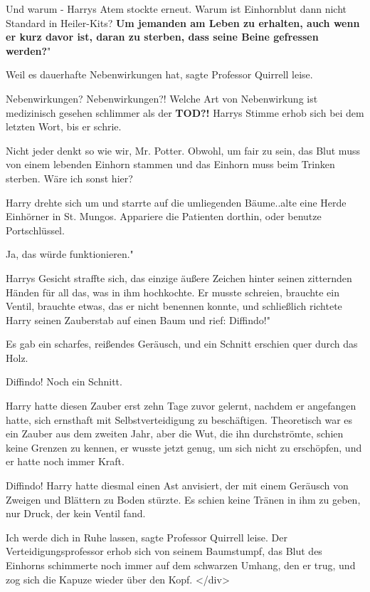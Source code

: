 \glqq{}Und warum -\grqq{} Harrys Atem stockte erneut. \glqq{}Warum ist Einhornblut
dann nicht Standard in Heiler-Kits? \textbf{Um jemanden am Leben zu
erhalten, auch wenn er kurz davor ist, daran zu sterben, dass seine Beine
gefressen werden?}"

\glqq{}Weil es dauerhafte Nebenwirkungen hat\grqq{}, sagte Professor Quirrell
leise.

\glqq{}Nebenwirkungen? Nebenwirkungen?! Welche Art von Nebenwirkung ist
medizinisch gesehen schlimmer als der \textbf{TOD?!}\grqq{} Harrys Stimme
erhob sich bei dem letzten Wort, bis er schrie.

\glqq{}Nicht jeder denkt so wie wir, Mr. Potter. Obwohl, um fair zu sein, das
Blut muss von einem lebenden Einhorn stammen und das Einhorn muss beim
Trinken sterben. Wäre ich sonst hier?\grqq{}

Harry drehte sich um und starrte auf die umliegenden Bäume.\grqq{}.alte eine
Herde Einhörner in St. Mungos. Appariere die Patienten dorthin, oder
benutze Portschlüssel.\grqq{}

\glqq{}Ja, das würde funktionieren."

Harrys Gesicht straffte sich, das einzige äußere Zeichen hinter seinen
zitternden Händen für all das, was in ihm hochkochte. Er musste schreien,
brauchte ein Ventil, brauchte etwas, das er nicht benennen konnte, und
schließlich richtete Harry seinen Zauberstab auf einen Baum und rief:
\glqq{}Diffindo!"

Es gab ein scharfes, reißendes Geräusch, und ein Schnitt erschien quer durch das
Holz.

\glqq{}Diffindo!\grqq{} Noch ein Schnitt.

Harry hatte diesen Zauber erst zehn Tage zuvor gelernt, nachdem er angefangen
hatte, sich ernsthaft mit Selbstverteidigung zu beschäftigen. Theoretisch
war es ein Zauber aus dem zweiten Jahr, aber die Wut, die ihn
durchströmte, schien keine Grenzen zu kennen, er wusste jetzt genug, um
sich nicht zu erschöpfen, und er hatte noch immer Kraft.

\glqq{}Diffindo!\grqq{} Harry hatte diesmal einen Ast anvisiert, der mit einem
Geräusch von Zweigen und Blättern zu Boden stürzte. Es schien keine
Tränen in ihm zu geben, nur Druck, der kein Ventil fand.

\glqq{}Ich werde dich in Ruhe lassen\grqq{}, sagte Professor Quirrell leise. Der
Verteidigungsprofessor erhob sich von seinem Baumstumpf, das Blut des
Einhorns schimmerte noch immer auf dem schwarzen Umhang, den er trug, und
zog sich die Kapuze wieder über den Kopf. </div>